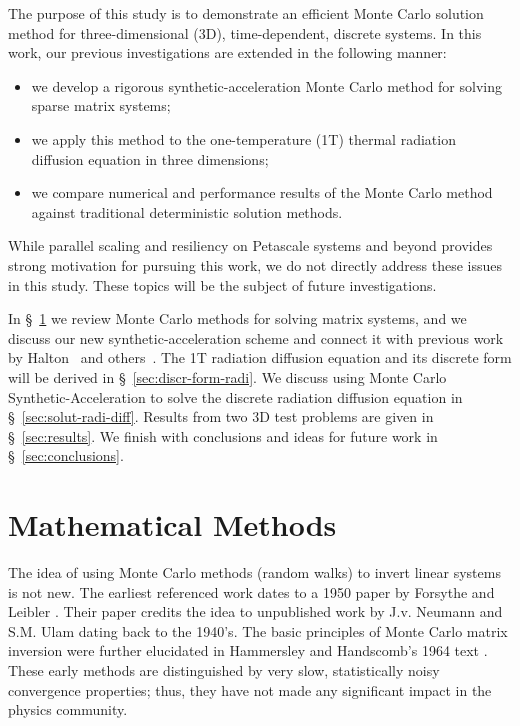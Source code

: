 \documentclass[preprint,12pt]{elsarticle}
\begin{document}
The purpose of this study is to demonstrate an efficient Monte Carlo solution
method for three-dimensional (3D), time-dependent, discrete systems. In this
work, our previous investigations are extended in the following manner:
\begin{itemize}
\item we develop a rigorous synthetic-acceleration Monte Carlo method
  for solving sparse matrix systems;
\item we apply this method to the one-temperature (1T) thermal radiation
  diffusion equation in three dimensions;
\item we compare numerical and performance results of the Monte Carlo
  method against traditional deterministic solution methods.
\end{itemize}
While parallel scaling and resiliency on Petascale systems and beyond provides
strong motivation for pursuing this work, we do not directly address these
issues in this study.  These topics will be the subject of future
investigations.

In \S~\ref{sec:monte-carlo-matrix} we review Monte Carlo methods for solving
matrix systems, and we discuss our new synthetic-acceleration scheme and
connect it with previous work by Halton~\cite{halton_1994} and
others~\cite{evans_2003}.  The 1T radiation diffusion equation and its
discrete form will be derived in \S~\ref{sec:discr-form-radi}.  We discuss
using Monte Carlo Synthetic-Acceleration to solve the discrete radiation
diffusion equation in \S~\ref{sec:solut-radi-diff}.  Results from two 3D test
problems are given in \S~\ref{sec:results}.  We finish with conclusions and
ideas for future work in \S~\ref{sec:conclusions}.

\section{Mathematical Methods}
\label{sec:monte-carlo-matrix}

The idea of using Monte Carlo methods (random walks) to invert linear systems
is not new.  The earliest referenced work dates to a 1950 paper by Forsythe
and Leibler \cite{forsythe}.  Their paper credits the idea to unpublished work
by J.v. Neumann and S.M. Ulam dating back to the 1940's.  The basic principles
of Monte Carlo matrix inversion were further elucidated in Hammersley and
Handscomb's 1964 text \cite{hammersley_1964}.  These early methods are
distinguished by very slow, statistically noisy convergence properties; thus,
they have not made any significant impact in the physics community.
\end{document}
